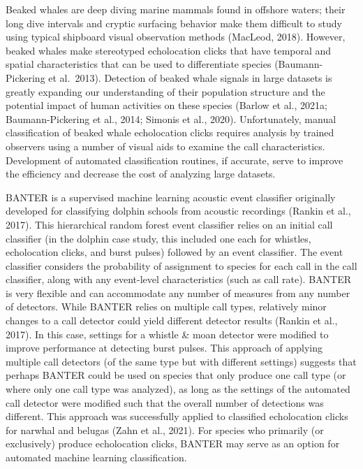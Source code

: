 \documentclass[
  letterpaper,
  DIV=11,
  numbers=noendperiod]{scrartcl}
\begin{document}
Beaked whales are deep diving marine mammals found in offshore waters;
their long dive intervals and cryptic surfacing behavior make them
difficult to study using typical shipboard visual observation methods
(MacLeod, 2018). However, beaked whales make stereotyped echolocation
clicks that have temporal and spatial characteristics that can be used
to differentiate species (Baumann-Pickering et al.~2013). Detection of
beaked whale signals in large datasets is greatly expanding our
understanding of their population structure and the potential impact of
human activities on these species (Barlow et al., 2021a;
Baumann-Pickering et al., 2014; Simonis et al., 2020). Unfortunately,
manual classification of beaked whale echolocation clicks requires
analysis by trained observers using a number of visual aids to examine
the call characteristics. Development of automated classification
routines, if accurate, serve to improve the efficiency and decrease the
cost of analyzing large datasets.

BANTER is a supervised machine learning acoustic event classifier
originally developed for classifying dolphin schools from acoustic
recordings (Rankin et al., 2017). This hierarchical random forest event
classifier relies on an initial call classifier (in the dolphin case
study, this included one each for whistles, echolocation clicks, and
burst pulses) followed by an event classifier. The event classifier
considers the probability of assignment to species for each call in the
call classifier, along with any event-level characteristics (such as
call rate). BANTER is very flexible and can accommodate any number of
measures from any number of detectors. While BANTER relies on multiple
call types, relatively minor changes to a call detector could yield
different detector results (Rankin et al., 2017). In this case, settings
for a whistle \& moan detector were modified to improve performance at
detecting burst pulses. This approach of applying multiple call
detectors (of the same type but with different settings) suggests that
perhaps BANTER could be used on species that only produce one call type
(or where only one call type was analyzed), as long as the settings of
the automated call detector were modified such that the overall number
of detections was different. This approach was successfully applied to
classified echolocation clicks for narwhal and belugas (Zahn et al.,
2021). For species who primarily (or exclusively) produce echolocation
clicks, BANTER may serve as an option for automated machine learning
classification.
\end{document}
